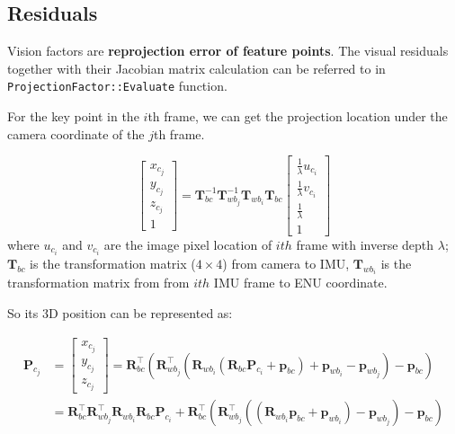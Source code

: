 \documentclass[12pt]{report}   %
\begin{document}
\subsection{Residuals}

	Vision factors are \textbf{reprojection error of feature points}. The visual residuals together with their Jacobian matrix calculation can be referred to in \verb|ProjectionFactor::Evaluate| function. 
	
	For the key point in the $i$th frame, we can get the projection location under the camera coordinate of the $j$th frame.
	
\begin{equation}
	\left[\begin{array}{c}
	{x_{c_{j}}} \\ {y_{c_{j}}} \\ {z_{c_{j}}} \\ {1}
	\end{array}\right] =
	\mathbf{T}_{b c}^{-1} 
	\mathbf{T}_{w b_{j}}^{-1} 
	\mathbf{T}_{w b_{i}} 
	\mathbf{T}_{b c}
	\left[\begin{array}{c}
	{\frac{1}{\lambda} u_{c_{i}}} \\ 
	{\frac{1}{\lambda} v_{c_{i}}} \\ 
	{\frac{1}{\lambda}} \\ 
	{1}
	\end{array}\right]\label{reproj_error}
\end{equation}
where $u_{c_i}$ and $v_{c_i}$ are the image pixel location of $ith$ frame with inverse depth $\lambda$; $\mathbf{T}_{b c}$ is the transformation matrix ($4\times4$) from camera to IMU, $\mathbf{T}_{w b_{i}}$ is the transformation matrix from from $ith$ IMU frame to ENU coordinate.
	
	So its 3D position can be represented as:
	
\begin{equation}
	\label{equ:pcj}
	\begin{aligned} 
	\mathbf{P}_{c_{j}} 
	&=
	\left[\begin{array}{c}
	{x_{c_{j}}} \\ {y_{c_{j}}} \\ {z_{c_{j}}}
	\end{array}\right] 
	=
	\mathbf{R}_{b c}^{\top} \left(
	\mathbf{R}_{w b_{j}}^{\top} \left(
	\mathbf{R}_{w b_{i}} \left(
	\mathbf{R}_{b c} 
	\mathbf{P}_{c_i}
	+ \mathbf{p}_{b c} \right)
	+ \mathbf{p}_{w b_{i}} - \mathbf{p}_{w b_{j}}\right)
	- \mathbf{p}_{b c}\right) \\
	&=
	\mathbf{R}_{b c}^{\top} 
	\mathbf{R}_{w b_{j}}^{\top} 
	\mathbf{R}_{w b_{i}} 
	\mathbf{R}_{b c} 
	\mathbf{P}_{c_i} +
	\mathbf{R}_{b c}^{\top}
	\left(\mathbf{R}_{w b_{j}}^{\top} 
	\left(\left(\mathbf{R}_{w b_{i}} \mathbf{p}_{b c}+\mathbf{p}_{w b_{i}}\right)
	-\mathbf{p}_{w b_{j}}\right)-\mathbf{p}_{b c}\right) 
	\end{aligned}
\end{equation}
	
\end{document}
